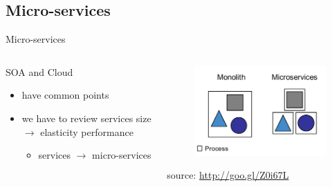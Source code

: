 \subsection{Micro-services}
\begin{frame}{Micro-services}
	\begin{columns}
		\begin{column}{0.6\textwidth}
			SOA and Cloud
			\begin{itemize}
				\item{\footnotesize{have common points}}
				\item{\footnotesize{we have to review services size $\rightarrow{}$ elasticity performance}}
				\begin{itemize}
					\item{\scriptsize{services $\rightarrow{}$ micro-services}}
				\end{itemize}
			\end{itemize}
		\end{column}
		\begin{column}{0.4\textwidth}
			\begin{figure}
				\centering{}
				\includegraphics[scale=0.25]{images/micro-services.png}
			\end{figure}
			\begin{flushright}
				\tiny{source: \url{http://goo.gl/Z0i67L}}
			\end{flushright}
		\end{column}
	\end{columns}
\end{frame}

